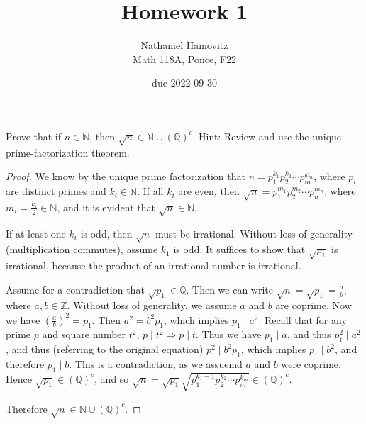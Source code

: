 \documentclass{article}
\newcommand{\Z}{\mathbb{Z}}
\newcommand{\N}{\mathbb{N}}
\newcommand{\Q}{\mathbb{Q}}
\newcommand{\paren}[1]{\left( #1 \right)}
\newenvironment{problem}[2][Problem]{\begin{trivlist}
\item[\hskip \labelsep {\bfseries #1}\hskip \labelsep {\bfseries #2.}]}{\end{trivlist}}
\begin{document}


\title{Homework 1} %
\author{Nathaniel Hamovitz\\Math 118A, Ponce, F22}
\date{due 2022-09-30}

\maketitle

\begin{problem}{1}
Prove that if $n \in \N$, then $\sqrt{n} \in \N \cup (\Q)^c$. Hint: Review and use the unique-prime-factorization theorem.
\end{problem}
\begin{proof}
    We know by the unique prime factorization that $n = p_1^{k_1} p_2^{k_2} \cdots p_m^{k_m}$, where $p_i$ are distinct primes and $k_i \in \N$. If all $k_i$ are even, then $\sqrt{n} = p_1^{m_1} p_2^{m_2} \cdots p_n^{m_n}$, where $m_i = \frac{k_i}{2} \in \N$, and it is evident that $\sqrt{n} \in \N$.

    If at least one $k_i$ is odd, then $\sqrt{n}$ must be irrational.
    Without loss of generality (multiplication commutes), assume $k_1$ is odd. It suffices to show that $\sqrt{p_1}$ is irrational, because the product of an irrational number is irrational.
    
    Assume for a contradiction that $\sqrt{p_1} \in \Q$. Then we can write $\sqrt{n} = \sqrt{p_1}= \frac{a}{b}$, where $a, b \in \Z$. Without loss of generality, we assume $a$ and $b$ are coprime. Now we have $\paren{\frac{a}{b}}^2 = p_1$. Then $a^2 = b^2 p_1$, which implies $p_1 \mid a^2$. Recall that for any prime $p$ and square number $t^2$, $p \mid t^2 \Rightarrow p \mid t$. Thus we have $p_1 \mid a$, and thus $p_1^2 \mid a^2$, and thus (referring to the original equation) $p_1^2 \mid b^2 p_1$, which implies $p_1 \mid b^2$, and therefore $p_1 \mid b$. This is a contradiction, as we assuemd $a$ and $b$ were coprime. Hence $\sqrt{p_1} \in (\Q)^c$, and so $\sqrt{n} = \sqrt{p_1} \sqrt{p_1^{k_1 - 1} p_2^{k_2} \cdots p_m^{k_m}} \in (\Q)^c$.

    Therefore $\sqrt{n} \in \N \cup (\Q)^c$.
\end{proof}
\end{document}
